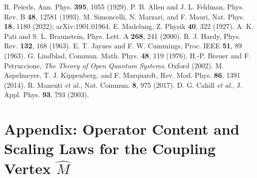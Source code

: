 \documentclass[aps,prb,preprint,amsmath,amssymb]{revtex4-2} %
\begin{document}
\begin{thebibliography}{99}
 R. Peierls, Ann. Phys. \textbf{395}, 1055 (1929).
 P. B. Allen and J. L. Feldman, Phys. Rev. B \textbf{48}, 12581 (1993).
 M. Simoncelli, N. Marzari, and F. Mauri, Nat. Phys. \textbf{18}, 1180 (2022); arXiv:1901.01964.
 E. Madelung, Z. Physik \textbf{40}, 322 (1927).
 A. K. Pati and S. L. Braunstein, Phys. Lett. A \textbf{268}, 241 (2000).
 R. J. Hardy, Phys. Rev. \textbf{132}, 168 (1963).
 E. T. Jaynes and F. W. Cummings, Proc. IEEE \textbf{51}, 89 (1963).
 G. Lindblad, Commun. Math. Phys. \textbf{48}, 119 (1976).
 H.-P. Breuer and F. Petruccione, \textit{The Theory of Open Quantum Systems}, Oxford (2002).
 M. Aspelmeyer, T. J. Kippenberg, and F. Marquardt, Rev. Mod. Phys. \textbf{86}, 1391 (2014).
 R. Manenti \textit{et al.}, Nat. Commun. \textbf{8}, 975 (2017).
 D. G. Cahill \textit{et al.}, J. Appl. Phys. \textbf{93}, 793 (2003).
\end{thebibliography}


\appendix
    \section*{Appendix: Operator Content and Scaling Laws for the Coupling Vertex \texorpdfstring{$\hat M$}{M}}

    \newcommand{\OmegaZero}{\Omega_{0}}
    \newcommand{\EE}{\mathrm{e}}
    \newcommand{\ii}{\mathrm{i}}
    \newcommand{\dd}{\mathrm{d}}

    \newcommand{\cVal}{2.99792458\times10^{8}}        %
    \newcommand{\hbarVal}{1.054571817\times10^{-34}}  %

\end{document}
